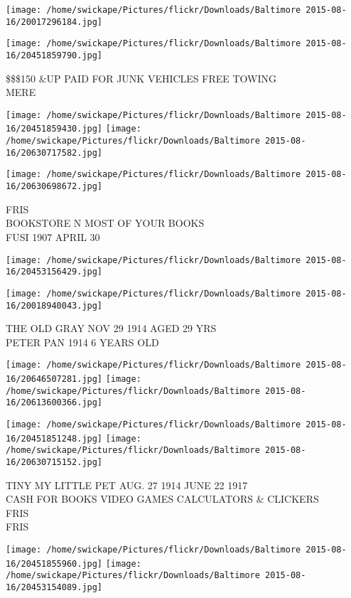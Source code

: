\documentclass[10pt,letterpaper]{article}
\begin{document}
\texttt{[image: /home/swickape/Pictures/flickr/Downloads/Baltimore 2015-08-16/20017296184.jpg]}

\vspace{0.25in}
\texttt{[image: /home/swickape/Pictures/flickr/Downloads/Baltimore 2015-08-16/20451859790.jpg]}

\$\$\$150 \&UP PAID FOR JUNK VEHICLES FREE TOWING\\
MERE
\pagebreak

\texttt{[image: /home/swickape/Pictures/flickr/Downloads/Baltimore 2015-08-16/20451859430.jpg]}
\texttt{[image: /home/swickape/Pictures/flickr/Downloads/Baltimore 2015-08-16/20630717582.jpg]}

\vspace{0.25in}
\texttt{[image: /home/swickape/Pictures/flickr/Downloads/Baltimore 2015-08-16/20630698672.jpg]}

FRIS\\
BOOKSTORE N MOST OF YOUR BOOKS\\
FUSI 1907 APRIL 30
\pagebreak

\texttt{[image: /home/swickape/Pictures/flickr/Downloads/Baltimore 2015-08-16/20453156429.jpg]}

\vspace{0.25in}
\texttt{[image: /home/swickape/Pictures/flickr/Downloads/Baltimore 2015-08-16/20018940043.jpg]}

THE OLD GRAY NOV 29 1914 AGED 29 YRS\\
PETER PAN 1914 6 YEARS OLD
\pagebreak

\texttt{[image: /home/swickape/Pictures/flickr/Downloads/Baltimore 2015-08-16/20646507281.jpg]}
\texttt{[image: /home/swickape/Pictures/flickr/Downloads/Baltimore 2015-08-16/20613600366.jpg]}

\texttt{[image: /home/swickape/Pictures/flickr/Downloads/Baltimore 2015-08-16/20451851248.jpg]}
\texttt{[image: /home/swickape/Pictures/flickr/Downloads/Baltimore 2015-08-16/20630715152.jpg]}

TINY MY LITTLE PET AUG. 27 1914 JUNE 22 1917\\
CASH FOR BOOKS VIDEO GAMES CALCULATORS \& CLICKERS\\
FRIS\\
FRIS
\pagebreak

\texttt{[image: /home/swickape/Pictures/flickr/Downloads/Baltimore 2015-08-16/20451855960.jpg]}
\texttt{[image: /home/swickape/Pictures/flickr/Downloads/Baltimore 2015-08-16/20453154089.jpg]}
\end{document}
